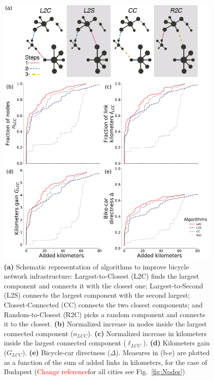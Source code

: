\begin{figure}[htbp]
  \centering
  \includegraphics[width=\textwidth]{images/datadriven/Fig03.pdf}
  \caption[Algorithms improvement]{\textbf{(a)} Schematic representation of algorithms to improve bicycle network infrastructure: Largest-to-Closest (L2C) finds the largest component and connects it with the closest one; Largest-to-Second (L2S) connects the largest component with the second largest; Closest-Connected (CC) connects the two closest components; and Random-to-Closest (R2C) picks a random component and connects it to the closest. \textbf{(b)} Normalized increase in nodes inside the largest connected component ($n_{LCC}$). \textbf{(c)} Normalized increase in kilometers inside the largest connected component ($\ell_{LCC}$). \textbf{(d)} Kilometers gain ($G_{LCC}$). \textbf{(e)} Bicycle-car directness ($\Delta$). Measures in (b-e) are plotted as a function of the sum of added links in kilometers, for the case of Budapest (\textcolor{red}{Change reference}for all cities see Fig.~\ref{fig:Nodes})}
  \label{fig:Algorithms}
\end{figure}

